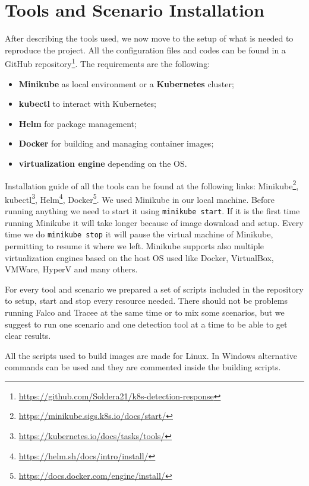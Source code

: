 \section{Tools and Scenario Installation}
\label{sec:install}

After describing the tools used, we now move to the setup of what is needed to reproduce the project. All the configuration files and codes can be found in a GitHub repository\footnote{\url{https://github.com/Soldera21/k8s-detection-response}}. The requirements are the following:
\begin{itemize}
    \item \textbf{Minikube} as local environment or a \textbf{Kubernetes} cluster;
    \item \textbf{kubectl} to interact with Kubernetes;
    \item \textbf{Helm} for package management;
    \item \textbf{Docker} for building and managing container images;
    \item \textbf{virtualization engine} depending on the OS.
\end{itemize}
Installation guide of all the tools can be found at the following links: Minikube\footnote{\url{https://minikube.sigs.k8s.io/docs/start/}}, kubectl\footnote{\url{https://kubernetes.io/docs/tasks/tools/}}, Helm\footnote{\url{https://helm.sh/docs/intro/install/}}, Docker\footnote{\url{https://docs.docker.com/engine/install/}}.
We used Minikube in our local machine. Before running anything we need to start it using \texttt{minikube start}. If it is the first time running Minikube it will take longer because of image download and setup. Every time we do \texttt{minikube stop} it will pause the virtual machine of Minikube, permitting to resume it where we left. Minikube supports also multiple virtualization engines based on the host OS used like Docker, VirtualBox, VMWare, HyperV and many others.

For every tool and scenario we prepared a set of scripts included in the repository to setup, start and stop every resource needed. There should not be problems running Falco and Tracee at the same time or to mix some scenarios, but we suggest to run one scenario and one detection tool at a time to be able to get clear results.

All the scripts used to build images are made for Linux. In Windows alternative commands can be used and they are commented inside the building scripts.


